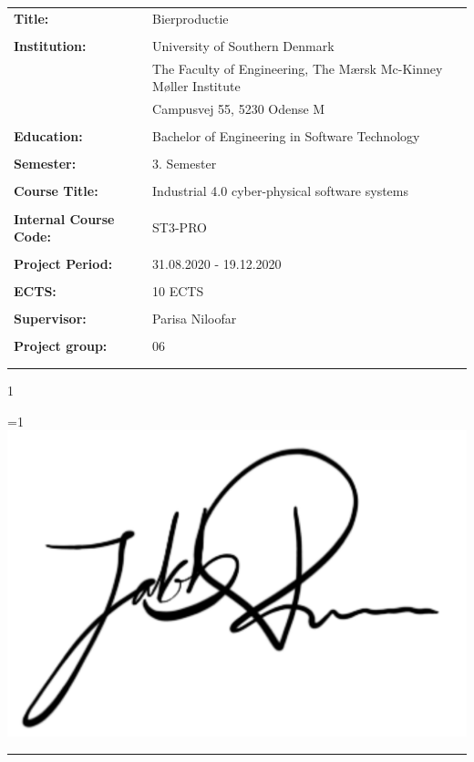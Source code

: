 \begin{tabular}{@{}l l} 
\textbf{Title:} & Bierproductie \\
& \\
\textbf{Institution:} & University of Southern Denmark \\
& The Faculty of Engineering, The Mærsk Mc-Kinney Møller Institute \\
& Campusvej 55, 5230 Odense M \\
& \\
\textbf{Education:} & Bachelor of Engineering in Software Technology\\
& \\
\textbf{Semester:} & 3. Semester \\
& \\
\textbf{Course Title:} & Industrial 4.0 cyber-physical software systems \\
& \\
\textbf{Internal Course Code:} & ST3-PRO \\
& \\
\textbf{Project Period:} &  31.08.2020 - 19.12.2020\\
& \\
\textbf{ECTS:} & 10 ECTS\\
& \\
\textbf{Supervisor:} & Parisa Niloofar\\
& \\
\textbf{Project group:} & 06\\
& \\

\\
\end{tabular}

\setcounter{PROD} {1}



\ifnum \value{PROD}=1
    \includegraphics[scale=0.07]{images/signatures/signatureJR.jpg}
    \vspace{-9.5mm}
\fi
\par\rule{\textwidth}{0.4pt}

